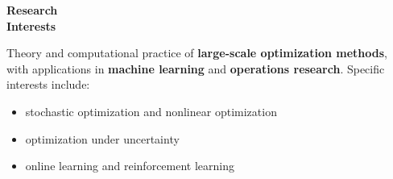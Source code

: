 \documentclass[11pt]{article}
\begin{document}
\begin{minipage}[t]{0.18\textwidth}
\textbf{Research\\ Interests}
\end{minipage}
\begin{minipage}[t]{0.8\textwidth}
Theory and computational practice of {\bf large-scale optimization methods}, with applications in {\bf machine learning} and {\bf operations research}. Specific interests include:
\begin{itemize}\itemsep0em
\item stochastic optimization and nonlinear optimization
\item optimization under uncertainty
\item online learning and reinforcement learning
\end{itemize}

\end{minipage} \newline\newline
\end{document}

